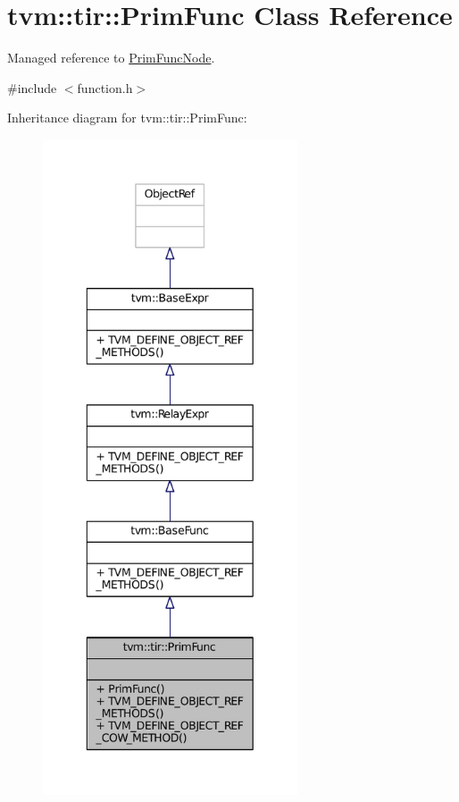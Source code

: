 \hypertarget{classtvm_1_1tir_1_1PrimFunc}{}\section{tvm\+:\+:tir\+:\+:Prim\+Func Class Reference}
\label{classtvm_1_1tir_1_1PrimFunc}


Managed reference to \hyperlink{classtvm_1_1tir_1_1PrimFuncNode}{Prim\+Func\+Node}.  




{\ttfamily \#include $<$function.\+h$>$}



Inheritance diagram for tvm\+:\+:tir\+:\+:Prim\+Func\+:
\nopagebreak
\begin{figure}[H]
\begin{center}
\leavevmode
\includegraphics[height=550pt]{classtvm_1_1tir_1_1PrimFunc__inherit__graph}
\end{center}
\end{figure}


